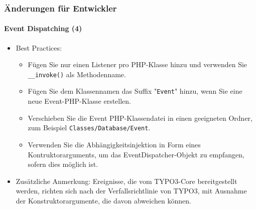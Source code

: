 
\begin{frame}[fragile]
	\frametitle{Änderungen für Entwickler}
	\framesubtitle{Event Dispatching (4)}

	\lstset{basicstyle=\tiny\ttfamily}

	\begin{itemize}
		\item Best Practices:

			\begin{itemize}
				\item Fügen Sie nur einen Listener pro PHP-Klasse hinzu und verwenden Sie \texttt{\_\_invoke()} als Methodenname.
				\item Fügen Sie dem Klassennamen das Suffix "\texttt{Event}" hinzu, wenn Sie eine neue Event-PHP-Klasse erstellen.
				\item Verschieben Sie die Event PHP-Klassendatei in einen geeigneten Ordner, zum Beispiel \texttt{Classes/Database/Event}.
				\item Verwenden Sie die Abhängigkeitsinjektion in Form eines Kontruktorarguments, um das 
					EventDispatcher-Objekt zu empfangen, sofern dies möglich ist.
			\end{itemize}

		\item Zusätzliche Anmerkung:\newline
			\small
				Ereignisse, die vom TYPO3-Core bereitgestellt werden, richten sich nach der Verfallsrichtlinie von TYPO3, mit Ausnahme der Konstruktorargumente,
				die davon abweichen können.
			\normalsize

	\end{itemize}

\end{frame}


